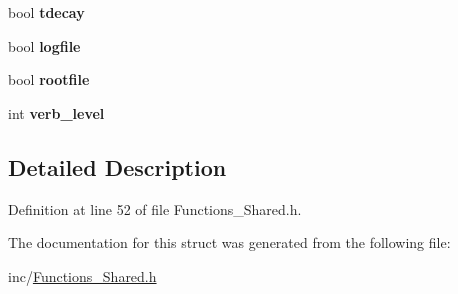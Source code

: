 \begin{DoxyCompactItemize}
\item 
\hypertarget{structopt_aedbcd7fea16a0fa968a1d75884fc0a4c}{bool {\bfseries tdecay}}\label{structopt_aedbcd7fea16a0fa968a1d75884fc0a4c}

\item 
\hypertarget{structopt_af0867351f5c3fd59d3cc5136cf423fc9}{bool {\bfseries logfile}}\label{structopt_af0867351f5c3fd59d3cc5136cf423fc9}

\item 
\hypertarget{structopt_a8d7af1ad473a324bd3633c7ef412c3fc}{bool {\bfseries rootfile}}\label{structopt_a8d7af1ad473a324bd3633c7ef412c3fc}

\item 
\hypertarget{structopt_abe0f9e730fd8eb6b107169359c859a3d}{int {\bfseries verb\-\_\-level}}\label{structopt_abe0f9e730fd8eb6b107169359c859a3d}

\end{DoxyCompactItemize}


\subsection{Detailed Description}


Definition at line 52 of file Functions\-\_\-\-Shared.\-h.



The documentation for this struct was generated from the following file\-:\begin{DoxyCompactItemize}
\item 
inc/\hyperlink{Functions__Shared_8h}{Functions\-\_\-\-Shared.\-h}\end{DoxyCompactItemize}
